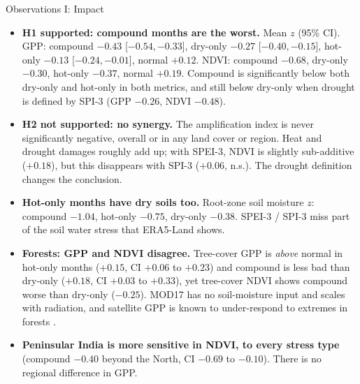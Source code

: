 \documentclass[12pt,aspectratio=169]{beamer}
\begin{document}
\begin{frame}{Observations I: Impact}
  \scriptsize
  \begin{itemize}
    \item \textbf{H1 supported: compound months are the worst.} Mean $z$
      (95\% CI). GPP: compound $-0.43$ [$-0.54,-0.33$], dry-only $-0.27$
      [$-0.40,-0.15$], hot-only $-0.13$ [$-0.24,-0.01$], normal $+0.12$.
      NDVI: compound $-0.68$, dry-only $-0.30$, hot-only $-0.37$, normal
      $+0.19$. Compound is significantly below both dry-only and hot-only in
      both metrics, and still below dry-only when drought is defined by SPI-3
      (GPP $-0.26$, NDVI $-0.48$).
    \item \textbf{H2 not supported: no synergy.} The amplification index is
      never significantly negative, overall or in any land cover or region.
      Heat and drought damages roughly add up; with SPEI-3, NDVI is slightly
      sub-additive ($+0.18$), but this disappears with SPI-3 ($+0.06$, n.s.).
      The drought definition changes the conclusion.
    \item \textbf{Hot-only months have dry soils too.} Root-zone soil
      moisture $z$: compound $-1.04$, hot-only $-0.75$, dry-only $-0.38$.
      SPEI-3 / SPI-3 miss part of the soil water stress that ERA5-Land
      shows.
    \item \textbf{Forests: GPP and NDVI disagree.} Tree-cover GPP is
      \emph{above} normal in hot-only months ($+0.15$, CI $+0.06$ to $+0.23$)
      and compound is less bad than dry-only ($+0.18$, CI $+0.03$ to
      $+0.33$), yet tree-cover NDVI
      shows compound worse than dry-only ($-0.25$). MOD17 has no
      soil-moisture input and scales with radiation, and satellite GPP is
      known to under-respond to extremes in forests \citep{flach2021}.
    \item \textbf{Peninsular India is more sensitive in NDVI, to every
      stress type} (compound $-0.40$ beyond the North, CI $-0.69$ to
      $-0.10$). There is no regional difference in GPP.
  \end{itemize}
\end{frame}
\end{document}
